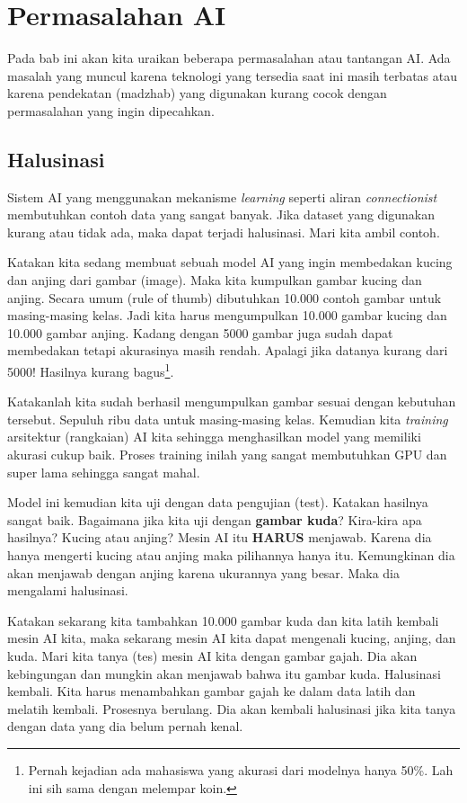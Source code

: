 \chapter{Permasalahan AI}
Pada bab ini akan kita uraikan beberapa permasalahan atau tantangan AI.
Ada masalah yang muncul karena teknologi yang tersedia saat ini masih
terbatas atau karena pendekatan (madzhab) yang digunakan kurang cocok
dengan permasalahan yang ingin dipecahkan.

\section{Halusinasi}
Sistem AI yang menggunakan mekanisme \emph{learning} seperti aliran
\emph{connectionist} membutuhkan contoh data yang sangat banyak.
Jika dataset yang digunakan kurang atau tidak ada, maka dapat terjadi 
halusinasi.
Mari kita ambil contoh.

Katakan kita sedang membuat sebuah model AI yang ingin membedakan
kucing dan anjing dari gambar (image).
Maka kita kumpulkan gambar kucing dan anjing.
Secara umum (rule of thumb) dibutuhkan 10.000 contoh gambar untuk
masing-masing kelas. Jadi kita harus mengumpulkan 10.000 gambar kucing
dan 10.000 gambar anjing. Kadang dengan 5000 gambar juga sudah dapat
membedakan tetapi akurasinya masih rendah. Apalagi jika datanya kurang
dari 5000! Hasilnya kurang bagus\footnote{Pernah kejadian ada mahasiswa
yang akurasi dari modelnya hanya 50\%. Lah ini sih sama dengan melempar
koin.}.

Katakanlah kita sudah berhasil mengumpulkan gambar sesuai dengan kebutuhan
tersebut. Sepuluh ribu data untuk masing-masing kelas.
Kemudian kita \emph{training} arsitektur (rangkaian) AI kita sehingga
menghasilkan model yang memiliki akurasi cukup baik.
Proses training inilah yang sangat membutuhkan GPU dan super lama
sehingga sangat mahal.

Model ini kemudian kita uji dengan data pengujian (test).
Katakan hasilnya sangat baik.
Bagaimana jika kita uji dengan \textbf{gambar kuda}?
Kira-kira apa hasilnya? Kucing atau anjing?
Mesin AI itu \textbf{HARUS} menjawab.
Karena dia hanya mengerti kucing atau anjing maka pilihannya hanya itu.
Kemungkinan dia akan menjawab dengan anjing karena ukurannya yang besar.
Maka dia mengalami halusinasi.

Katakan sekarang kita tambahkan 10.000 gambar kuda dan kita latih kembali
mesin AI kita, maka sekarang mesin AI kita dapat mengenali kucing, anjing,
dan kuda.
Mari kita tanya (tes) mesin AI kita dengan gambar gajah.
Dia akan kebingungan dan mungkin akan menjawab bahwa itu gambar kuda.
Halusinasi kembali.
Kita harus menambahkan gambar gajah ke dalam data latih dan melatih kembali.
Prosesnya berulang.
Dia akan kembali halusinasi jika kita tanya dengan data yang dia belum
pernah kenal.

